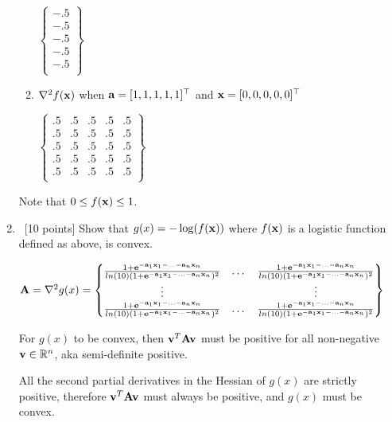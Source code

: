 \documentclass[12pt, fullpage,letterpaper]{article}
\begin{document}
\begin{enumerate}
\begin{enumerate}
$
\begin{Bmatrix}
	-.5 \\
	-.5 \\
	-.5 \\
	-.5 \\
	-.5 \\
\end{Bmatrix}
$

\item $\nabla^2 f({\bf x})$  when ${\bf a} = [1,1,1,1,1]^\top$ and ${\bf x} = [0,0,0,0,0]^\top$

$
\begin{Bmatrix}
.5 & .5 & .5 & .5 & .5 \\
.5 & .5 & .5 & .5 & .5 \\
.5 & .5 & .5 & .5 & .5 \\
.5 & .5 & .5 & .5 & .5 \\
.5 & .5 & .5 & .5 & .5 \\
\end{Bmatrix}
$

\end{enumerate}
Note that $0 \le f({\bf x}) \le 1$.

\item~[10 points] Show that $g(x) = -\log(f({\bf x}))$ where $f({\bf x})$ is a logistic function defined as above, is convex. 

${\bf A} = \nabla^2 g(x) = 
\begin{Bmatrix}
\frac{1+{\bf e}^{-{\bf a}_1{\bf x}_1 - ... - {\bf a}_n{\bf x}_n}}{ln(10)(1+{\bf e}^{-{\bf a}_1{\bf x}_1 - ... - {\bf a}_n{\bf x}_n})^2} & \dots &  \frac{1+{\bf e}^{-{\bf a}_1{\bf x}_1 - ... - {\bf a}_n{\bf x}_n}}{ln(10)(1+{\bf e}^{-{\bf a}_1{\bf x}_1 - ... - {\bf a}_n{\bf x}_n})^2} \\
\vdots & & \vdots\\
\frac{1+{\bf e}^{-{\bf a}_1{\bf x}_1 - ... - {\bf a}_n{\bf x}_n}}{ln(10)(1+{\bf e}^{-{\bf a}_1{\bf x}_1 - ... - {\bf a}_n{\bf x}_n})^2} & \dots & \frac{1+{\bf e}^{-{\bf a}_1{\bf x}_1 - ... - {\bf a}_n{\bf x}_n}}{ln(10)(1+{\bf e}^{-{\bf a}_1{\bf x}_1 - ... - {\bf a}_n{\bf x}_n})^2}\\
\end{Bmatrix}
$

For $g(x)$ to be convex, then ${\bf v}^T{\bf A}{\bf v}$ must be positive for all non-negative ${\bf v} \in \mathbb{R}^n$, aka semi-definite positive. 

All the second partial derivatives in the Hessian of $g(x)$ are strictly positive, therefore ${\bf v}^T{\bf A}{\bf v}$ must always be positive, and $g(x)$ must be convex. 

\end{enumerate}
\end{document}
